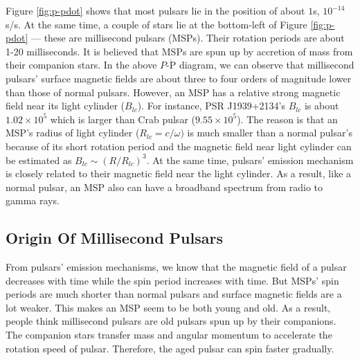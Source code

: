 \documentclass[12pt]{report}
\begin{document}
      Figure \ref{fig:p-pdot} shows that most pulsars lie in the position of about 
      $1$s, $10^{-14}$s/s. At the same time, a couple of stars lie at the bottom-left 
      of Figure \ref{fig:p-pdot} --- these are millisecond pulsars (MSPs). Their 
      rotation periods are about 1-20 milliseconds. It is believed that MSPs are spun 
      up by accretion of mass from their companion stars. In the above 
      $P$-$\dot{\mbox{P}}$ diagram, we can observe that millisecond pulsars' 
      surface magnetic fields are about three to four orders of magnitude lower than those
      of normal pulsars. However, an MSP has a relative strong magnetic field near its 
      light cylinder ($B_{lc}$). For instance, PSR J1939+2134's $B_{lc}$ is about 
      $1.02\times10^5$ which is larger than Crab pulsar ($9.55\times10^5$).
      \citep{ATNF}
      The reason is that an MSP's radius 
      of light cylinder ($R_{lc}=c/\omega)$ is much smaller than a normal pulsar's 
      because of its short rotation period and the magnetic field near light cylinder can
      be estimated as $B_{lc}\sim\left(R/R_{lc}\right)^3$. At the same time, 
      pulsars' emission mechanism is closely related to their magnetic field near the light 
      cylinder. As a result, like a normal pulsar, an MSP also can have a broadband spectrum 
      from radio to gamma rays. 
    \subsection{Origin Of Millisecond Pulsars}
      From pulsars' emission mechanisms, we know that the magnetic field of a pulsar 
      decreases with time while the spin period increases with time. But MSPs' spin 
      periods are much shorter than normal pulsars and surface magnetic fields are a 
      lot weaker. This makes an MSP seem to be both young and old. As a result,
      people think millisecond pulsars are old pulsars spun up by their companions. 
      The companion stars transfer mass and angular momentum to accelerate the rotation
      speed of pulsar. Therefore, the aged pulsar can spin faster gradually. 
\end{document}

